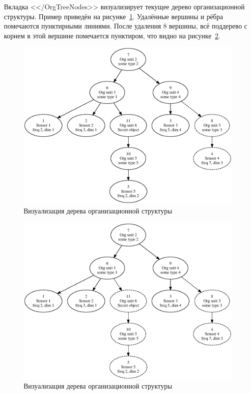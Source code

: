 Вкладка <</OrgTreeNodes>> визуализирует текущее дерево организационной структуры. Пример приведён на рисунке~\ref{demo1}. Удалённые вершины и рёбра помечаются пунктирными линиями. После удаления $8$ вершины, всё поддерево с корнем в этой вершине помечается пунктиром, что видно на рисунке~\ref{demo2}.

\begin{figure}
    \includegraphics[scale=0.6]{../img/demo_del8.eps}
    \caption{Визуализация дерева организационной структуры}
    \label{demo1}
\end{figure}

\begin{figure}
    \includegraphics[scale=0.6]{../img/demo_del8,11.eps}
    \caption{Визуализация дерева организационной структуры}
    \label{demo2}
\end{figure}

